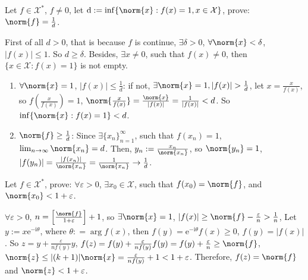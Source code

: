 \documentclass{ctexart}
\newif\ifpreface
\begin{document}
\large
\setlength{\baselineskip}{1.2em}
\ifpreface
    
\else
\maketitle
\fi
{}
\begin{problem}\label{pro:1}
  Let \(f \in \mathcal{X}^*\), \(f \neq 0\), let \(\mathrm{d}:= \inf\{\norm{x}: f(x)=1, x \in \mathcal{X}\}\),
  prove: \(\norm{f}=\frac{1}{d}\).
\end{problem}
\begin{solution}
  First of all \(d > 0\), that is because \(f\) is continue, \(\exists \delta > 0 \), \(\forall \norm{x} < \delta\), \(|f(x)| \leq 1\). 
  So \(d \geq \delta\). Besides, \(\exists x \neq 0\), such that \(f(x) \neq 0\), then \(\{x \in \mathcal{X}: f(x) =1 \}\) is not empty.
  \begin{enumerate}
    \item \(\forall \norm{x} = 1\), \( |f(x)| \leq \frac{1}{d}\): if not, \(\exists \norm{x} = 1, |f(x)| > \frac{1}{d}\), 
      let \(x = \frac{x}{f(x)}\), so \(f(\frac{x}{f(x)}) = 1\), \(\norm{\frac{x}{f(x)}} = \frac{\norm{x}}{|f(x)|} = \frac{1}{|f(x)|} < d \).
      So \(\inf\{\norm{x}: f(x) =1\} < d\).
    \item \(\norm{f} \geq \frac{1}{d}\): Since \(\exists \{x_n\}_{n=1}^{\infty}\), such that \(f(x_n) = 1\), \(\lim_{n \to \infty} \norm{x_n} = d\).
      Then, \(y_n:=\frac{x_n}{\norm{x_n}}\), so \(\norm{y_n} = 1\), \(|f(y_n)| = \frac{|f(x_n)|}{\norm{x_n}}=\frac{1}{\norm{x_n}} \to \frac{1}{d}\).
  \end{enumerate}
\end{solution}

\begin{problem}
  Let \(f \in \mathcal{X}^*\), prove: \(\forall \varepsilon >0\), \(\exists x_0 \in \mathcal{X}\), such that 
  \(f(x_{0}) = \norm{f}\), and \(\norm{x_{0}}< 1+ \varepsilon\).
\end{problem}

\begin{solution}
  \(\forall \varepsilon > 0\), \(n = \left[ \frac{\norm{f}}{1+ \varepsilon}\right] + 1\), so \(\exists \norm{x}=1\), \(|f(x)| \geq \norm{f} - \frac{\varepsilon}{n} > \frac{1}{n}\),
  Let \(y := x \mathrm{e}^{-\mathrm{i} \theta}\), where \(\theta: = \arg f(x)\), then \(f(y) = \mathrm{e}^{-\mathrm{i} \theta}f(x) \geq 0\), \(f(y) = |f(x)|\).
  So \(z = y + \frac{\varepsilon}{n f(y)} y \), \(f(z) = f(y) + \frac{\varepsilon}{n f(y)} f(y) = f(y)+ \frac{\varepsilon}{n} \geq \norm{f}\), \(\norm{z} \leq |(k+1)|\norm{x} = \frac{\varepsilon}{n f(y)}+1 < 1 + \varepsilon\).
  Therefore, \(f(z) = \norm{f}\) and \(\norm{z} < 1+ \varepsilon\).
\end{solution}
\end{document}
